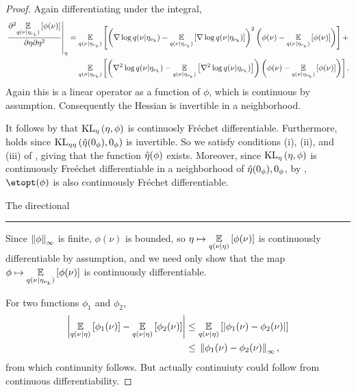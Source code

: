 \begin{thm}
\begin{proof}
Again differentiating under the integral,
%
\begin{align*}
%
\fracat{\partial^2 \expect{\q(\nu \vert \etanuk)}
              {\phi(\nu)}}{\partial \eta \partial \eta^2}{\eta} ={}&
\expect{\q(\nu \vert \etanuk)}
       {\left(\nabla \log \q(\nu \vert \etanuk)
         - \expect{\q(\nu \vert \etanuk)}
                  {\nabla \log \q(\nu \vert \etanuk)}
       \right)^2
       \left( \phi(\nu) - \expect{\q(\nu \vert \etanuk)}{\phi(\nu)} \right)} +
\\&
\expect{\q(\nu \vert \etanuk)}{
       \left(                            \nabla^2 \log \q(\nu \vert \etanuk)
        - \expect{\q(\nu \vert \etanuk)}{\nabla^2 \log \q(\nu \vert \etanuk)}
       \right)
       \left( \phi(\nu) - \expect{\q(\nu \vert \etanuk)}{\phi(\nu)} \right)
       }.
%
\end{align*}
%
Again this is a linear operator as a function of $\phi$, which is continuous by
assumption.  Consequently the Hessian is invertible in a neighborhood.

It follows by \citet[Proposition 4.14(c)]{zeidler:2013:functional} that
$\mathrm{KL}_{\eta}\left(\eta, \phi\right)$ is continuosly Fr{\'e}chet differentiable.  Furthermore,
\citet[Chapter 4 Condition 21b]{zeidler:2013:functional} holds since
$\mathrm{KL}_{\eta\eta}\left(\hat\eta(0_\phi), 0_\phi\right)$ is invertible.  So we satisfy conditions (i),
(ii), and (iii) of \citet[Theorem 4.B(c)]{zeidler:2013:functional}, giving that
the function $\hat\eta(\phi)$ exists.  Moreover, since $\mathrm{KL}_{\eta}\left(\eta, \phi\right)$ is
continuously Fre{\'e}chet differentiable in a neighborhood of $\hat\eta(0_\phi),
0_\phi$, by \citet[Theorem 4.B(d)]{zeidler:2013:functional}, $\etopt(\phi)$ is
also continuously Fr{\'e}chet differentiable.

The directional




\noindent\rule{\textwidth}{1pt}


Since $\left\Vert\phi\right\Vert_{\infty}$ is finite, $\phi(\nu)$ is
bounded, so $\eta \mapsto \underset{q(\nu \vert \eta)}{\mathbb{E}}\left[\phi(\nu)\right]$ is
continuously differentiable by assumption, and we need only show that the map
$\phi \mapsto \underset{q(\nu \vert \eta_{\nu_{k}})}{\mathbb{E}}\left[\phi(\nu)\right]$ is continuously
differentiable.

For two functions $\phi_1$ and $\phi_2$,
%
\begin{align*}
%
\abs{\expect{\q(\nu \vert \eta)}{\phi_1(\nu)} -
     \expect{\q(\nu \vert \eta)}{\phi_2(\nu)}}
\le{}&
\expect{\q(\nu \vert \eta)}{\abs{\phi_1(\nu) - \phi_2(\nu)}}\\
\le{}&
\norminf{\phi_1(\nu) - \phi_2(\nu)},
%
\end{align*}
%
from which continunity follows.  But actually continuiuty could follow from
continuous differentiability.


\end{proof}
\end{thm}
